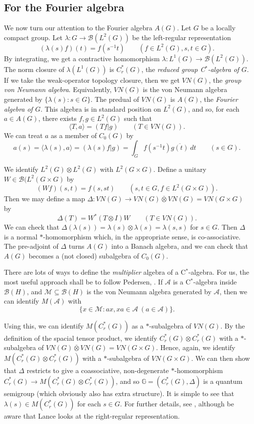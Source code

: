 \documentclass[twoside,a4paper]{article}
\theoremstyle{definition}
\theoremstyle{remark}
\newcommand{\hip}[2]{(#1|#2)}
\newcommand{\mc}{\mathcal}
\newcommand{\ip}[2]{\langle{#1},{#2}\rangle}
\begin{document}
\subsection{For the Fourier algebra}

We now turn our attention to the Fourier algebra $A(G)$.  Let $G$ be a locally compact
group.  Let $\lambda:G\rightarrow\mc B(L^2(G))$ be the left-regular representation
\[ (\lambda(s)f)(t) = f(s^{-1}t) \qquad (f\in L^2(G), s,t\in G). \]
By integrating, we get a contractive homomorphism $\lambda:L^1(G)\rightarrow\mc B(L^2(G))$.
The norm closure of $\lambda(L^1(G))$ is $C^*_r(G)$, the \emph{reduced group C$^*$-algebra
of $G$}.  If we take the weak-operator topology closure, then we get $VN(G)$, the
\emph{group von Neumann algebra}.  Equivalently, $VN(G)$ is the von Neumann algebra
generated by $\{ \lambda(s) : s\in G \}$.
The predual of $VN(G)$ is $A(G)$, the \emph{Fourier
algebra of $G$}.  This algebra is in standard position on $L^2(G)$, and so, for each
$a\in A(G)$, there exists $f,g\in L^2(G)$ such that
\[ \ip{T}{a} = \hip{Tf}{g} \qquad (T\in VN(G)). \]
We can treat $a$ as a member of $C_0(G)$ by
\[ a(s) = \ip{\lambda(s)}{a} = \hip{\lambda(s)f}{g}
= \int_G f(s^{-1}t) \overline{g(t)} \ dt \qquad (s\in G). \]

We identify $L^2(G)\otimes L^2(G)$ with $L^2(G\times G)$.  Define a unitary
$W\in\mc B(L^2(G\times G)$ by
\[ (Wf)(s,t) = f(s,st) \qquad (s,t\in G, f\in L^2(G\times G)). \]
Then we may define a map $\Delta:VN(G)\rightarrow VN(G)\overline\otimes VN(G)
= VN(G\times G)$ by
\[ \Delta(T) = W^*(T\otimes I)W \qquad (T\in VN(G)). \]
We can check that $\Delta(\lambda(s)) = \lambda(s)\otimes\lambda(s) = \lambda(s,s)$
for $s\in G$.  Then $\Delta$ is a normal $*$-homomorphism which, in the appropriate
sense, is co-associative.  The pre-adjoint of $\Delta$ turns $A(G)$ into a Banach
algebra, and we can check that $A(G)$ becomes a (not closed) subalgebra of $C_0(G)$.

There are lots of ways to define the \emph{multiplier} algebra of a C$^*$-algebra.
For us, the most useful approach shall be to follow Pedersen, \cite[Section~3.12]{ped}.
If $\mc A$ is a C$^*$-algebra inside $\mc B(H)$, and $\mc M\subseteq\mc B(H)$ is the von
Neumann algebra generated by $\mc A$, then we can identify $M(\mc A)$ with
\[ \{ x\in\mc M : ax,xa \in \mc A \ (a\in\mc A) \}. \]

Using this, we can identify $M(C^*_r(G))$ as a $*$-subalgebra of $VN(G)$.  By the
definition of the spacial tensor product, we identify $C^*_r(G)\otimes C^*_r(G)$ with
a $*$-subalgebra of $VN(G)\overline\otimes VN(G) = VN(G\times G)$.  Hence,
again, we identify $M(C^*_r(G)\otimes C^*_r(G))$ with a $*$-subalgebra of
$VN(G\times G)$.  We can then show that $\Delta$ restricts to give a coassociative,
non-degenerate $*$-homomorphism $C^*_r(G) \rightarrow M(C^*_r(G) \otimes C^*_r(G))$, and 
so $\mathbb G = (C^*_r(G),\Delta)$ is a quantum semigroup (which obviously also has extra
structure).  It is simple to see that $\lambda(s) \in M(C^*_r(G))$ for each $s\in G$.
For further details, see \cite[Chapter~8]{lance}, although be aware that Lance looks
at the right-regular representation.
\end{document}
